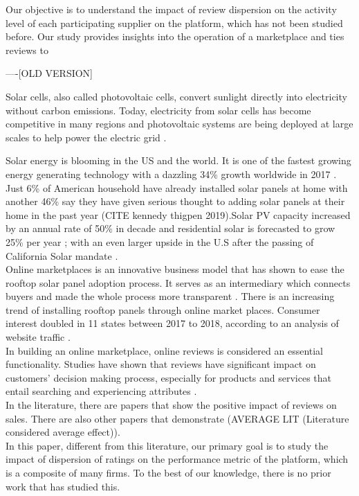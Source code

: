 \documentclass[msom,blindrev]{informs3}
\begin{document}
Our objective is to understand the impact of review dispersion on the activity level of each participating supplier on the platform, which has not been studied before. Our study provides insights into the operation of a marketplace and ties reviews to


----[OLD VERSION]

Solar cells, also called photovoltaic cells, convert sunlight directly into electricity without carbon emissions. Today, electricity from solar cells has become competitive in many regions and photovoltaic systems are being deployed at large scales to help power the electric grid \citep{nrel.gov}.

Solar energy is blooming in the US and the world. It is one of the fastest growing energy generating technology with a dazzling 34\% growth worldwide in 2017 \citep{iea2018snapshot}. Just 6\% of American household have already installed solar panels at home with another 46\% say they have given serious thought to adding solar panels at their home in the past year (CITE kennedy thigpen 2019).Solar PV capacity increased by an annual rate of 50\%  in decade and residential solar is forecasted to grow 25\% per year \citep{weaver_2019,seia}; with an even larger upside in the U.S after the passing of California Solar mandate \citep{gtmsolar2018}. \\
Online marketplaces is an innovative business model that has shown to ease the rooftop solar panel adoption process. It serves as an intermediary which connects buyers and made the whole process more transparent \citep{dorsey2019access}. There is an increasing trend of installing rooftop panels through online market places. Consumer interest doubled in 11 states between 2017 to 2018, according to an analysis of website traffic \citep{energysageintel19}.  \\
In building an online marketplace, online reviews is considered an essential functionality. Studies have shown that reviews have significant impact on customers'  decision making process, especially for products and services that entail searching and experiencing attributes \citep{zimmermann2018decomposing}.  \\
In the literature, there are papers that show the positive impact of reviews on sales. There are also other papers that demonstrate  (AVERAGE LIT (Literature considered average effect)).\\
In this paper, different from this literature, our primary goal is to study the impact of dispersion of ratings on the  performance metric of the platform, which is a composite of many firms. To the best of our knowledge, there is no prior work that has studied this.
\end{document}
